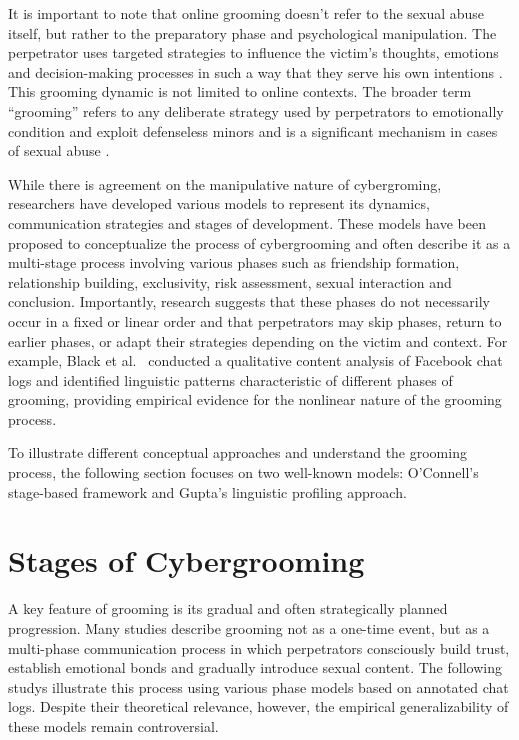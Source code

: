 It is important to note that online grooming doesn't refer to the sexual abuse itself, but rather to the preparatory phase and psychological manipulation. The perpetrator uses targeted strategies to influence the victim's thoughts, emotions and decision-making processes in such a way that they serve his own intentions \parencite{schittenhelm2024cybergrooming}. This grooming dynamic is not limited to online contexts. The broader term “grooming” refers to any deliberate strategy used by perpetrators to emotionally condition and exploit defenseless minors and is a significant mechanism in cases of sexual abuse \parencite{craven2006grooming}.

While there is agreement on the manipulative nature of cybergroming, researchers have developed various models to represent its dynamics, communication strategies and stages of development\parencite{kloess2014online}. These models have been proposed to conceptualize the process of cybergrooming and often describe it as a multi-stage process involving various phases such as friendship formation, relationship building, exclusivity, risk assessment, sexual interaction and conclusion. Importantly, research suggests that these phases do not necessarily occur in a fixed or linear order and that perpetrators may skip phases, return to earlier phases, or adapt their strategies depending on the victim and context. For example, Black et al.\ \parencite{black2015linguistic} conducted a qualitative content analysis of Facebook chat logs and identified linguistic patterns characteristic of different phases of grooming, providing empirical evidence for the nonlinear nature of the grooming process. 

To illustrate different conceptual approaches and understand the grooming process, the following section focuses on two well-known models: O'Connell's stage-based framework and Gupta's linguistic profiling approach. %




\section{Stages of Cybergrooming}

A key feature of grooming is its gradual and often strategically planned progression. Many studies describe grooming not as a one-time event, but as a multi-phase communication process in which perpetrators consciously build trust, establish emotional bonds and gradually introduce sexual content. The following studys illustrate this process using various phase models based on annotated chat logs. Despite their theoretical relevance, however, the empirical generalizability of these models remain controversial.

